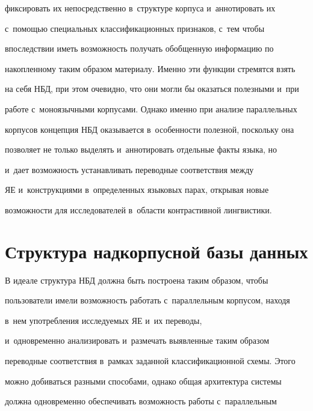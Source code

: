 фиксировать их непосредственно в~структуре корпуса и~аннотировать их  


с~по\-мощью специальных классификационных признаков, с~тем чтобы 


впослед\-ст\-вии иметь воз\-мож\-ность получать обобщенную информацию по 


накопленному таким образом материалу. Именно эти функ\-ции стремятся взять 


на себя НБД, при этом очевидно, что они могли бы оказаться полезными и~при 


работе с~моноязычными корпусами. Однако именно при анализе параллельных 


корпусов концепция НБД оказывается в~осо\-бен\-ности полезной, поскольку она 


позволяет не только выделять и~аннотировать отдельные факты языка, но 


и~дает воз\-мож\-ность уста\-нав\-ли\-вать переводные соответствия между 


ЯЕ и~конструкциями в~определенных языковых парах, открывая новые 


возможности для исследователей в~об\-ласти контрастивной линг\-ви\-стики. 










\section{Структура надкорпусной базы данных}





   В идеале структура НБД должна быть построена таким образом, чтобы 


пользователи имели возможность работать с~параллельным корпусом, находя 


в~нем употребления исследуемых ЯЕ и~их переводы, 


и~одновременно анализировать и~размечать выявленные таким образом 


переводные соответствия в~рамках заданной классификационной схемы. Этого 


мож\-но добиваться разными способами, однако общая архитектура сис\-те\-мы 


должна одновременно обеспечивать воз\-мож\-ность работы с~параллельным 


